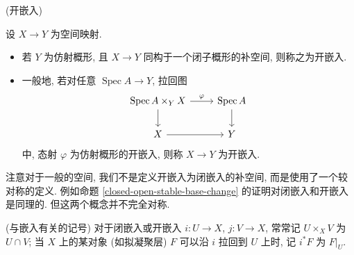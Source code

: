 \documentclass{book}
\begin{document}
	\begin{definition}
		[label={complement-open-embedding}]
		{(开嵌入)}
		
		设 $X\to Y$ 为空间映射.
		\begin{itemize}
			\item 若 $Y$ 为仿射概形, 且 $X\to Y$ 同构于一个闭子概形的补空间, 则称之为开嵌入.
			\item 一般地, 若对任意 $\operatorname{Spec} A\to Y$, 拉回图
			\[\begin{tikzcd}[ampersand replacement=\&]
				{\operatorname{Spec} A\times_Y X} \& {\operatorname{Spec} A} \\
				X \& Y
				\arrow["\varphi", from=1-1, to=1-2]
				\arrow[from=1-1, to=2-1]
				\arrow[from=1-2, to=2-2]
				\arrow[from=2-1, to=2-2]
			\end{tikzcd}\]
			中, 态射 $\varphi$ 为仿射概形的开嵌入, 则称 $X\to Y$ 为开嵌入.
		\end{itemize}
	\end{definition}
	
	注意对于一般的空间, 我们不是定义开嵌入为闭嵌入的补空间, 而是使用了一个较对称的定义. 例如命题 \ref{closed-open-stable-base-change} 的证明对闭嵌入和开嵌入是同理的. 但这两个概念并不完全对称.%
	
	\begin{remark}
		{(与嵌入有关的记号)}
		对于闭嵌入或开嵌入 $i\colon U\to X$, $j\colon V\to X$, 常常记 $U\times_X V$ 为 $U\cap V$; 当 $X$ 上的某对象 (如拟凝聚层) $F$ 可以沿 $i$ 拉回到 $U$ 上时, 记 $i^*F$ 为 $F|_U$.
	\end{remark}
	
\end{document}
